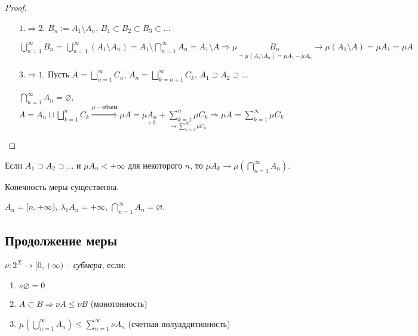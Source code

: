 \begin{proof}~
    \begin{enumerate}
        \item[$1. \Rightarrow 2.$] $B_n := A_1 \setminus A_n$,   $B_1 \subset B_2 \subset B_3 \subset ...$
        
        $\bigcup\limits_{n=1}^\infty B_n = \bigcup\limits_{n=1}^\infty (A_1 \setminus A_n) = A_1 \setminus \bigcap\limits_{n=1}^\infty A_n = A_1 \setminus A\Rightarrow
        \mu \underset{=\mu(A_1\setminus A_n)=\mu A_1 - \mu A_n}{B_n} \rightarrow \mu (A_1\setminus A) = \mu A_1=\mu A$

        \item[$3. \Rightarrow 1.$] Пусть $A=\bigsqcup\limits_{n=1}^\infty C_n$, $A_n=\bigsqcup\limits_{k=n+1}^\infty C_k$, $A_1 \supset A_2 \supset ...$ 
        
        $\bigcap\limits_{n=1}^\infty A_n =\varnothing$, $A=A_n \sqcup \bigsqcup\limits_{k=1}^n C_k\overset{\mu\text{ – объем}}{\Rightarrow}
        \mu A = \underset{\rightarrow 0}{\mu A_n}+\underset{\rightarrow\sum\limits_{k=1}^\infty \mu C_k}{\sum\limits_{k=1}^n \mu C_k}\Rightarrow
        \mu A = \sum\limits_{k=1}^\infty \mu C_k$
    \end{enumerate}
\end{proof}

\begin{corollary}
    Если $A_1 \supset A_2 \supset ...$ и $\mu A_n < +\infty$ для некоторого
    $n$, то $\mu A_k \rightarrow \mu (\bigcap\limits_{n=1}^\infty A_n)$.
\end{corollary}

\begin{remark}
    Конечность меры существенна.

    $A_n = [n, +\infty)$, $\lambda_1 A_n = +\infty$, $\bigcap\limits_{n=1}^\infty A_n =\varnothing$.
\end{remark}

\subsection{Продолжение меры}

\begin{definition}
    $\nu: 2^X \rightarrow [0, +\infty)$ – \textit{субмера}, если:
    \begin{enumerate}
        \item $\nu \varnothing =0$
        \item $A\subset B\Rightarrow \nu A\leq \nu B$ (монотонность)
        \item $\mu(\bigcup\limits_{n=1}^\infty A_n)\leq \sum\limits_{n=1}^\infty \nu A_n$ (счетная полуаддитивность)
    \end{enumerate}
\end{definition}

